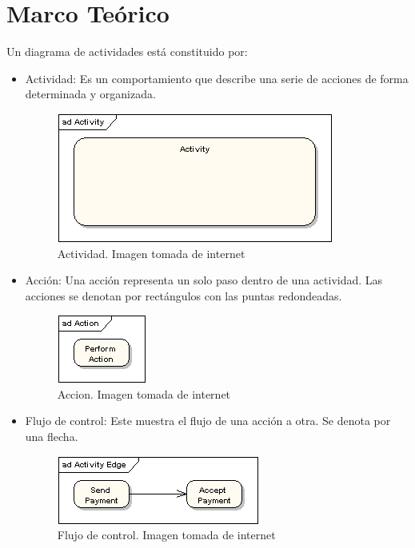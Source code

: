 \section{Marco Teórico}
Un diagrama de actividades está constituido por:
\begin{itemize}
\item Actividad: Es un comportamiento que describe una serie de acciones de forma determinada y organizada.
\begin{figure}[H]
	\centering
	\includegraphics[width=0.5\linewidth]{diseno/actividades/imgs/1}
	\caption{Actividad. Imagen tomada de internet}
	\label{fig:gantt}
\end{figure}
\item Acción: Una acción representa un solo paso dentro de una actividad. Las acciones se denotan por rectángulos con las puntas redondeadas.
\begin{figure}[H]
	\centering
	\includegraphics[width=0.5\linewidth]{diseno/actividades/imgs/3}
	\caption{Accion. Imagen tomada de internet}
	\label{fig:gantt}
\end{figure}
\item Flujo de control: Este muestra el flujo de una acción a otra. Se denota por una flecha.
\begin{figure}[H]
	\centering
	\includegraphics[width=0.5\linewidth]{diseno/actividades/imgs/2}
	\caption{Flujo de control. Imagen tomada de internet}
	\label{fig:gantt}

\end{figure}
\end{itemize}

